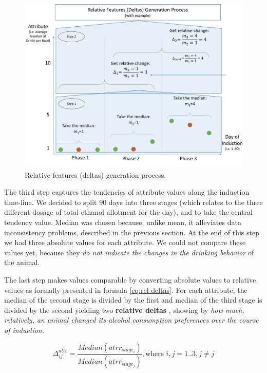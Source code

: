 	\begin{figure}[ht]
		\centering
		\includegraphics[width=1.1\linewidth]{figures/features_generation.pdf}
		\caption{Relative features (deltas) generation process.}
		\label{features_generation}
	\end{figure}
		
	The third step captures the tendencies of attribute values along the induction time-line. We decided to split 90 days into three stages (which relates to the three different dosage of total ethanol allotment for the day), and to take the central tendency value. Median was chosen because, unlike mean, it alleviates data inconsistency problems, described in the previous section. At the end of this step we had three absolute values for each attribute. We could not compare these values yet, because they \textit{do not indicate the changes in the drinking behavior} of the animal.
	
	The last step makes values comparable by converting absolute values to relative values as formally presented in formula \ref{eq:rel-deltas}. For each attribute, the median of the second stage is divided by the first and median of the third stage is divided by the second yielding two \textbf{relative deltas }, showing by \textit{how much, relatively, an animal changed its alcohol consumption preferences over the course of induction.} 
	
	\begin{equation} \label{eq:rel-deltas}
	\Delta_{ij}^{attr}=\frac{Median(atrr_{stage_i})}{Median(atrr_{stage_j})}, \text{where } i,j=1..3, j \neq j
	\end{equation}
	
